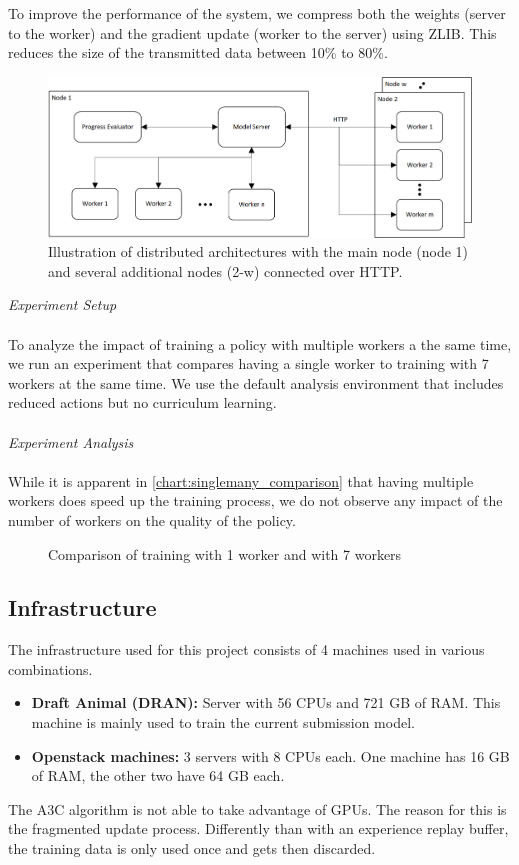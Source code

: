 To improve the performance of the system, we compress both the weights (server to the worker) and the gradient update (worker to the server) using ZLIB. This reduces the size of the transmitted data between 10\% to 80\%.
\begin{figure}[H]
	\centering
	\includegraphics[width=400pt]{images/visio/architecture.png}
	\caption{Illustration of distributed architectures with the main node (node 1) and several additional nodes (2-w) connected over HTTP.}
	\label{dist_architecture_img}
\end{figure}
\textit{Experiment Setup}\\\\
To analyze the impact of training a policy with multiple workers a the same time, we run an experiment that compares having a single worker to training with 7 workers at the same time. We use the default analysis environment that includes reduced actions but no curriculum learning.\\\\
\textit{Experiment Analysis}\\\\
While it is apparent in \autoref{chart:singlemany_comparison} that having multiple workers does speed up the training process, we do not observe any impact of the number of workers on the quality of the policy.
\begin{figure}[H]
	\begin{center}
		
	\end{center}
	\caption{Comparison of training with 1 worker and with 7 workers}
	\label{chart:singlemany_comparison}
\end{figure}
\subsection*{Infrastructure}\label{infrastructure}
The infrastructure used for this project consists of 4 machines used in various combinations.
\begin{itemize}
	\item \textbf{Draft Animal (DRAN):} Server with 56 CPUs and 721 GB of RAM. This machine is mainly used to train the current submission model.
	\item \textbf{Openstack machines:} 3 servers with 8 CPUs each. One machine has 16 GB of RAM, the other two have 64 GB each.
\end{itemize}
The A3C algorithm is not able to take advantage of GPUs. The reason for this is the fragmented update process. Differently than with an experience replay buffer, the training data is only used once and gets then discarded.
\newpage



